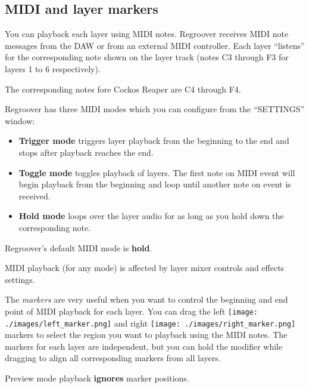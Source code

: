 \documentclass[12pt]{article}
\begin{document}
\subsection*{MIDI and layer markers}
You can playback each layer using MIDI notes. Regroover receives MIDI note messages from the DAW or from an external MIDI controller. Each layer ``listens'' for the corresponding note shown on the layer track (notes C3 through F3 for layers 1 to 6 respectively). 
\begin{mdframed}[style = warning]
The corresponding notes fore Cockos Reaper are C4 through F4.
\end{mdframed}
Regroover has three MIDI modes which you can configure from the ``SETTINGS'' window:
\begin{itemize}
\item \textbf{Trigger mode} triggers layer playback from the beginning to the end and stops after playback reaches the end.
\item \textbf{Toggle mode} toggles playback of layers. The first note on MIDI event will begin playback from the beginning and loop until another note on event is received.
\item \textbf{Hold mode} loops over the layer audio for as long as you hold down the corresponding note. %
\end{itemize}
\begin{mdframed}[style = info]
Regroover's default MIDI mode is \textbf{hold}.
\end{mdframed}

\begin{mdframed}[style = warning]
MIDI playback (for any mode) is affected by layer mixer controls and effects settings.
\end{mdframed}

The \textit{markers} are very useful when you want to control the beginning and end point of MIDI playback for each layer. You can drag the left \texttt{[image: ./images/left\_marker.png]} and right \texttt{[image: ./images/right\_marker.png]} markers to select the region you want to playback using the MIDI notes. The markers for each layer are independent, but you can hold the \keys{\shift} modifier while dragging to align all corresponding markers from all layers.
\begin{mdframed}[style = warning]
Preview mode playback \textbf{ignores} marker positions.
\end{mdframed}
\end{document}
